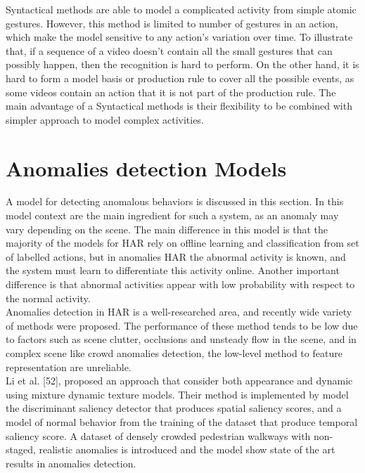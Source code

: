 Syntactical methods are able to model a complicated activity from simple atomic gestures. However, this method is limited to number of gestures in an action, which make the model sensitive to any action’s variation over time. To illustrate that, if a sequence of a video doesn’t contain all the small gestures that can possibly happen, then the recognition is hard to perform. On the other hand, it is hard to form a model basis or production rule to cover all the possible events, as some videos contain an action that it is not part of the production rule. The main advantage of a Syntactical methods is their flexibility to be combined with simpler approach to model complex activities.

\section{Anomalies detection Models}
\hspace{5mm} A model for detecting anomalous behaviors is discussed in this section. In this model context are the main ingredient for such a system, as an anomaly may vary depending on the scene. The main difference in this model is that the majority of the models for HAR rely on offline learning and classification from set of labelled actions, but in anomalies HAR the abnormal activity is known, and the system must learn to differentiate this activity online. Another important difference is that abnormal activities appear with low probability with respect to the normal activity. \\

Anomalies detection in HAR is a well-researched area, and recently wide variety of methods were proposed. The performance of these method tends to be low due to factors such as scene clutter, occlusions and unsteady flow in the scene, and in complex scene like crowd anomalies detection, the low-level method to feature representation are unreliable. \\
Li et al. [52], proposed an approach that consider both appearance and dynamic using mixture dynamic texture models. Their method is implemented by model the discriminant saliency detector that produces spatial saliency scores, and a model of normal behavior from the training of the dataset that produce temporal saliency score. A dataset of densely crowded pedestrian walkways with non-staged, realistic anomalies is introduced and the model show state of the art results in anomalies detection. \\

